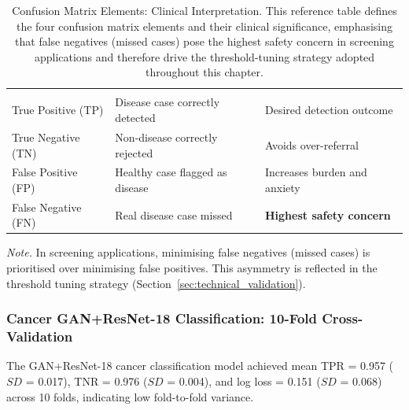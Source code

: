 {\tablestripes\tablefontsize
\begin{xltabular}{\textwidth}{@{} l L L @{}}
\caption[Confusion Matrix Elements: Clinical Interpretation]{Confusion Matrix Elements: Clinical Interpretation. This reference table defines the four confusion matrix elements and their clinical significance, emphasising that false negatives (missed cases) pose the highest safety concern in screening applications and therefore drive the threshold-tuning strategy adopted throughout this chapter.}\label{tab:confusion_matrix_meaning} \\
\toprule
{} &  &  \\
\midrule
\endfirsthead
\toprule
{} &  &  \\
\midrule
\endhead
\bottomrule
\endlastfoot
True Positive (TP) & Disease case correctly detected & Desired detection outcome \\
True Negative (TN) & Non-disease correctly rejected & Avoids over-referral \\
False Positive (FP) & Healthy case flagged as disease & Increases burden and anxiety \\
False Negative (FN) & Real disease case missed & \textbf{Highest safety concern} \\
\end{xltabular}}
\vspace{2pt}
\noindent\textit{Note.} In screening applications, minimising false negatives (missed cases) is prioritised over minimising false positives. This asymmetry is reflected in the threshold tuning strategy (Section~\ref{sec:technical_validation}).


\subsubsection{Cancer GAN+ResNet-18 Classification: 10-Fold Cross-Validation}

The GAN+ResNet-18 cancer classification model achieved mean TPR = 0.957 ($SD$ = 0.017), TNR = 0.976 ($SD$ = 0.004), and log loss = 0.151 ($SD$ = 0.068) across 10 folds, indicating low fold-to-fold variance.


